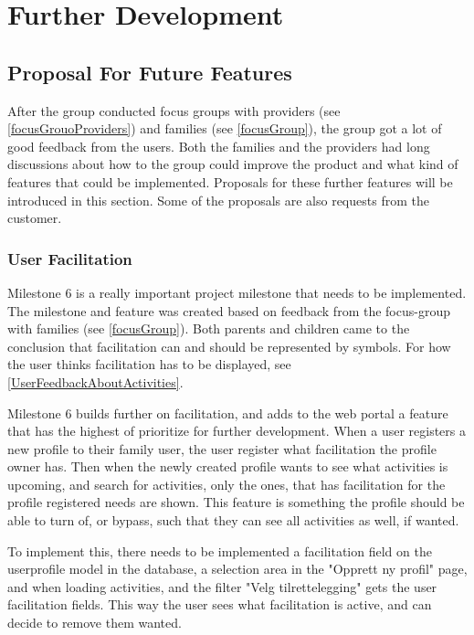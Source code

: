 
\chapter{Further Development}
\label{further_development}

\section{Proposal For Future Features}
After the group conducted focus groups with providers (see \ref{focusGrouoProviders}) and families (see \ref{focusGroup}), the group got a lot of good feedback from the users. Both the families and the providers had long discussions about how to the group could improve the product and what kind of features that could be implemented. Proposals for these further features will be introduced in this section. Some of the proposals are also requests from the customer.

\subsection{User Facilitation}
Milestone 6 is a really important project milestone that needs to be implemented. The milestone and feature was created based on feedback from the focus-group with families (see \ref{focusGroup}). Both parents and children came to the conclusion that facilitation can and should be represented by symbols. For how the user thinks facilitation has to be displayed, see \ref{UserFeedbackAboutActivities}. 

Milestone 6 builds further on facilitation, and adds to the web portal a feature that has the highest of prioritize for further development. When a user registers a new profile to their family user, the user register what facilitation the profile owner has. Then when the newly created profile wants to see what activities is upcoming, and search for activities, only the ones, that has facilitation for the profile registered needs are shown. This feature is something the profile should be able to turn of, or bypass, such that they can see all activities as well, if wanted.

To implement this, there needs to be implemented a facilitation field on the userprofile model in the database, a selection area in the "Opprett ny profil" page, and when loading activities, and the filter "Velg tilrettelegging" gets the user facilitation fields. This way the user sees what facilitation is active, and can decide to remove them wanted. 

